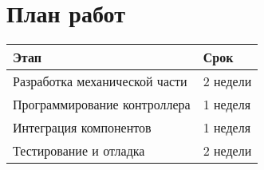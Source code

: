 \documentclass[a4paper,12pt]{article}
\begin{document}
\section{План работ}
\begin{tabular}{|l|l|}
\hline
Этап & Срок \\
\hline
Разработка механической части & 2 недели \\
Программирование контроллера & 1 неделя \\
Интеграция компонентов & 1 неделя \\
Тестирование и отладка & 2 недели \\
\hline
\end{tabular}
\end{document}

